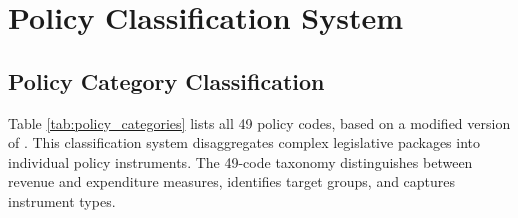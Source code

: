 \documentclass[12pt]{article}
\begin{document}
\newpage
\section{Policy Classification System}
\label{sec:policy_classification}

\subsection{Policy Category Classification}

Table \ref{tab:policy_categories} lists all 49 policy codes, based on a modified version of \citep{LaceyMassadUtz2021}. This classification system disaggregates complex legislative packages into individual policy instruments. The 49-code taxonomy distinguishes between revenue and expenditure measures, identifies target groups, and captures instrument types.
\end{document}
